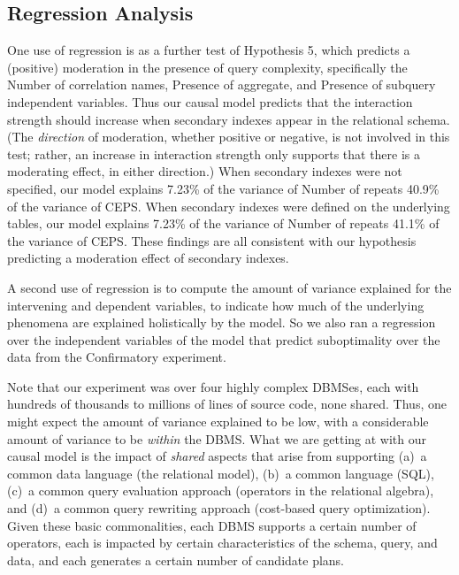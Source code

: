 \documentclass[prodmode,acmtods]{acmsmall}
\begin{document}
\subsection{Regression Analysis}\label{sec:regression}
One use of regression is as a further test of Hypothesis 5, which predicts a (positive)
moderation in the presence of query complexity, specifically the Number of
correlation names, Presence of aggregate, and Presence of subquery
independent variables. Thus our causal model predicts that the interaction
strength should increase when secondary indexes appear in the relational
schema. (The {\em direction} of moderation, whether positive or negative, is not involved in this test; rather,
an increase in interaction strength only supports that there is a moderating
effect, in either direction.) When
secondary indexes were not specified, our model explains 
7.23\% of the variance of Number of repeats 40.9\% of the variance of CEPS. When
secondary indexes were defined on the underlying tables, our model explains
7.23\% of the variance of Number of repeats 41.1\% of the variance of CEPS. These findings are all consistent with our
hypothesis predicting a moderation effect of secondary indexes.

A second use of regression is to compute the amount of variance explained
for the intervening and dependent variables, to indicate how much of the
underlying phenomena are explained holistically by the model.
 So we also ran a regression over the independent variables of the model that
predict suboptimality over the data from the Confirmatory experiment. 

Note that our experiment was over four highly complex DBMSes, each with
hundreds of thousands to millions of lines of source code, none shared.
Thus, one might expect the amount of variance explained to be low, with a
considerable amount of variance to be {\em within} the DBMS. What we are getting
at with our causal model is the impact of {\em shared} aspects that arise
from supporting (a)~a common data language (the relational model), (b)~a common
language (SQL), (c)~a common query evaluation approach (operators in the
relational algebra), and (d)~a common query rewriting approach (cost-based query
optimization). Given these basic commonalities, each DBMS supports a
certain number of operators, each is impacted by certain characteristics of
the schema, query, and data, and each generates a certain number of candidate
plans.
\end{document}
